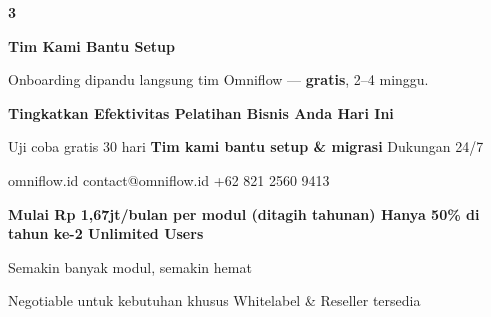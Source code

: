 \documentclass[a4paper]{article}
\begin{document}
\begin{center}
\begin{minipage}[t]{0.318\textwidth}
{\begin{minipage}[t][4.7cm][c]{\dimexpr\linewidth-2\fboxsep\relax}
            \begin{center}
                {\fontsize{22}{26}\selectfont\bfseries\color{BluePrimary} 3}
            \end{center}
            \vspace{2pt}
            \begin{center}
                {\fontsize{10}{13}\selectfont\bfseries\color{BlueDark} Tim Kami Bantu Setup}\par\vspace{3pt}
                {\fontsize{9}{12}\selectfont\color{TextDark} Onboarding dipandu langsung tim Omniflow --- \textbf{gratis}, 2--4 minggu.}
            \end{center}
        \end{minipage}}
\end{minipage}
\end{center}

\vspace{8pt}

{\setlength{\fboxsep}{10pt}\setlength{\fboxrule}{0pt}%
\noindent\colorbox{BluePrimary}{%
    \begin{minipage}{\dimexpr\textwidth-2\fboxsep\relax}
        \centering
        {\fontsize{13}{16}\selectfont\bfseries\color{White}
        Tingkatkan Efektivitas Pelatihan Bisnis Anda Hari Ini}\par\vspace{3pt}
        {\fontsize{9.5}{12}\selectfont\color{BlueMid}
        Uji coba gratis 30 hari \enspace\textbullet\enspace \textbf{Tim kami bantu setup \& migrasi} \enspace\textbullet\enspace Dukungan 24/7}\par\vspace{2pt}
        {\fontsize{9.5}{12}\selectfont\color{BlueLight}
        omniflow.id \enspace\textbullet\enspace contact@omniflow.id \enspace\textbullet\enspace +62 821 2560 9413}
    \end{minipage}}}


\vspace{6pt}

{\setlength{\fboxsep}{8pt}\setlength{\fboxrule}{0pt}%
\noindent\colorbox{BlueBg}{%
    \begin{minipage}{\dimexpr\textwidth-2\fboxsep\relax}
        \centering
        {\fontsize{9}{12}\selectfont\bfseries\color{BluePrimary}
        Mulai Rp 1,67jt/bulan per modul (ditagih tahunan) \enspace\textbullet\enspace Hanya 50\% di tahun ke-2 \enspace\textbullet\enspace Unlimited Users}\par\vspace{1pt}
        {\fontsize{8.5}{11}\selectfont\color{BlueDark}
        Semakin banyak modul, semakin hemat}\par\vspace{1pt}
        {\fontsize{8}{10}\selectfont\color{TextLight}
        Negotiable untuk kebutuhan khusus \enspace\textbullet\enspace Whitelabel \& Reseller tersedia}
    \end{minipage}}}

\restoregeometry
\pagestyle{empty}
\end{document}
